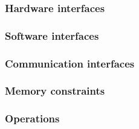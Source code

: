 \documentclass{scrreprt}
\begin{document}
\subsubsection{Hardware interfaces}


\subsubsection{Software interfaces}


\subsubsection{Communication interfaces}


\subsubsection{Memory constraints}


\subsubsection{Operations}
\end{document}
